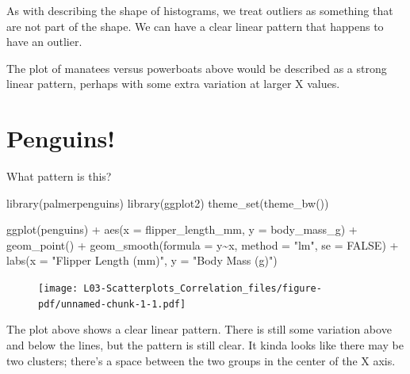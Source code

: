\documentclass[
  letterpaper,
  DIV=11,
  numbers=noendperiod]{scrreprt}
\newenvironment{Shaded}{\begin{snugshade}}{\end{snugshade}}
\newcommand{\AttributeTok}[1]{\textcolor[rgb]{0.40,0.45,0.13}{#1}}
\newcommand{\ConstantTok}[1]{\textcolor[rgb]{0.56,0.35,0.01}{#1}}
\newcommand{\FunctionTok}[1]{\textcolor[rgb]{0.28,0.35,0.67}{#1}}
\newcommand{\NormalTok}[1]{\textcolor[rgb]{0.00,0.23,0.31}{#1}}
\newcommand{\SpecialCharTok}[1]{\textcolor[rgb]{0.37,0.37,0.37}{#1}}
\newcommand{\StringTok}[1]{\textcolor[rgb]{0.13,0.47,0.30}{#1}}
\begin{document}
As with describing the shape of histograms, we treat outliers as
something that are not part of the shape. We can have a clear linear
pattern that happens to have an outlier.

The plot of manatees versus powerboats above would be described as a
strong linear pattern, perhaps with some extra variation at larger X
values.

\hypertarget{penguins}{%
\section{Penguins!}\label{penguins}}

\vspace{1cm}

What pattern is this?

\begin{Shaded}
\begin{Highlighting}[]
\FunctionTok{library}\NormalTok{(palmerpenguins)}
\FunctionTok{library}\NormalTok{(ggplot2)}
\FunctionTok{theme\_set}\NormalTok{(}\FunctionTok{theme\_bw}\NormalTok{())}

\FunctionTok{ggplot}\NormalTok{(penguins) }\SpecialCharTok{+} 
    \FunctionTok{aes}\NormalTok{(}\AttributeTok{x =}\NormalTok{ flipper\_length\_mm, }\AttributeTok{y =}\NormalTok{ body\_mass\_g) }\SpecialCharTok{+}
    \FunctionTok{geom\_point}\NormalTok{() }\SpecialCharTok{+} 
    \FunctionTok{geom\_smooth}\NormalTok{(}\AttributeTok{formula =}\NormalTok{ y}\SpecialCharTok{\textasciitilde{}}\NormalTok{x, }\AttributeTok{method =} \StringTok{"lm"}\NormalTok{, }\AttributeTok{se =} \ConstantTok{FALSE}\NormalTok{) }\SpecialCharTok{+}
    \FunctionTok{labs}\NormalTok{(}\AttributeTok{x =} \StringTok{"Flipper Length (mm)"}\NormalTok{,}
        \AttributeTok{y =} \StringTok{"Body Mass (g)"}\NormalTok{)}
\end{Highlighting}
\end{Shaded}

\begin{figure}[H]

{\centering \texttt{[image: L03-Scatterplots\_Correlation\_files/figure-pdf/unnamed-chunk-1-1.pdf]}

}

\end{figure}

The plot above shows a clear linear pattern. There is still some
variation above and below the lines, but the pattern is still clear. It
kinda looks like there may be two clusters; there's a space between the
two groups in the center of the X axis.
\end{document}
